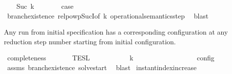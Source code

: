 \begin{isabellebody}
\isamarkupfalse%
\isanewline
\ \ \isamarkupfalse%
\ {\isacharparenleft}Suc\ k{\isacharparenright}\isanewline
\ \ \ \ \isamarkupfalse%
\ \isamarkupfalse%
\ {\isacharquery}case\isanewline
\ \ \ \ \isamarkupfalse%
\ branch{\isacharunderscore}existence\ relpowp{\isacharunderscore}Suc{\isacharunderscore}I{\isacharbrackleft}of\ {\isacartoucheopen}k{\isacartoucheclose}\ {\isacartoucheopen}operational{\isacharunderscore}semantics{\isacharunderscore}step{\isacartoucheclose}{\isacharbrackright}\ \isamarkupfalse%
\ blast\isanewline
{}\isamarkupfalse%
%
\endisatagproof
{\isafoldproof}%
%
\isadelimproof
%
\endisadelimproof
%
\begin{isamarkuptext}%
Any run from initial specification \isa{{\isasymPsi}} has a corresponding configuration
  \isa{{\isasymS}} at any reduction step number  starting from initial configuration.%
\end{isamarkuptext}\isamarkuptrue%
\isamarkupfalse%
\ completeness{\isacharcolon}\isanewline
\ \ \ {\isacartoucheopen}{\isasymrho}\ {\isasymin}\ {\isasymlbrakk}{\isasymlbrakk}\ {\isasymPsi}\ {\isasymrbrakk}{\isasymrbrakk}\isactrlsub T\isactrlsub E\isactrlsub S\isactrlsub L{\isacartoucheclose}\isanewline
\ \ \ {\isacartoucheopen}{\isasymexists}{\isasymS}{\isachardot}\ {\isacharparenleft}{\isacharparenleft}{\isacharbrackleft}{\isacharbrackright}{\isacharcomma}\ {}\ {\isasymturnstile}\ {\isasymPsi}\ {\isasymtriangleright}\ {\isacharbrackleft}{\isacharbrackright}{\isacharparenright}\ \ {\isasymhookrightarrow}\isactrlbsup k\isactrlesup \ \ {\isasymS}{\isacharparenright}\isanewline
\ \ \ \ \ \ \ \ \ \ \ {\isasymand}\ {\isasymrho}\ {\isasymin}\ {\isasymlbrakk}\ {\isasymS}\ {\isasymrbrakk}\isactrlsub c\isactrlsub o\isactrlsub n\isactrlsub f\isactrlsub i\isactrlsub g{\isacartoucheclose}\isanewline
%
\isadelimproof
\ \ %
\endisadelimproof
%
\isatagproof
{}\isamarkupfalse%
\ assms\ branch{\isacharunderscore}existence{\isacharprime}\ solve{\isacharunderscore}start\ \isamarkupfalse%
\ blast%
\endisatagproof
{\isafoldproof}%
%
\isadelimproof
%
\endisadelimproof
%
\isadelimdocument
%
\endisadelimdocument
%
\isatagdocument
%
\isamarkuptrue%
%
\endisatagdocument
{\isafolddocument}%
%
\isadelimdocument
%
\endisadelimdocument
{}\isamarkupfalse%
\ instant{\isacharunderscore}index{\isacharunderscore}increase{\isacharcolon}\isanewline

\end{isabellebody}

